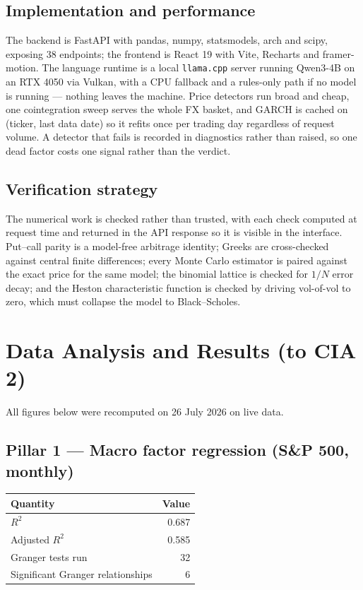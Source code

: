 \documentclass[11pt,a4paper]{article}
\begin{document}
\subsection{Implementation and performance}

The backend is FastAPI with pandas, numpy, statsmodels, arch and scipy, exposing 38
endpoints; the frontend is React 19 with Vite, Recharts and framer-motion. The language
runtime is a local \texttt{llama.cpp} server running Qwen3-4B on an RTX 4050 via Vulkan,
with a CPU fallback and a rules-only path if no model is running --- nothing leaves the
machine. Price detectors run broad and cheap, one cointegration sweep serves the whole FX
basket, and GARCH is cached on (ticker, last data date) so it refits once per trading day
regardless of request volume. A detector that fails is recorded in diagnostics rather than
raised, so one dead factor costs one signal rather than the verdict.

\subsection{Verification strategy}

The numerical work is checked rather than trusted, with each check computed at request time
and returned in the API response so it is visible in the interface. Put--call parity is a
model-free arbitrage identity; Greeks are cross-checked against central finite differences;
every Monte Carlo estimator is paired against the exact price for the same model; the
binomial lattice is checked for $1/N$ error decay; and the Heston characteristic function
is checked by driving vol-of-vol to zero, which must collapse the model to Black--Scholes.

\section{Data Analysis and Results (to CIA 2)}

All figures below were recomputed on 26 July 2026 on live data.

\subsection{Pillar 1 --- Macro factor regression (S\&P 500, monthly)}

\begin{center}
\begin{tabular}{lr}
\toprule
\textbf{Quantity} & \textbf{Value} \\
\midrule
$R^2$ & 0.687 \\
Adjusted $R^2$ & 0.585 \\
Granger tests run & 32 \\
Significant Granger relationships & 6 \\
\bottomrule
\end{tabular}
\end{center}
\end{document}
